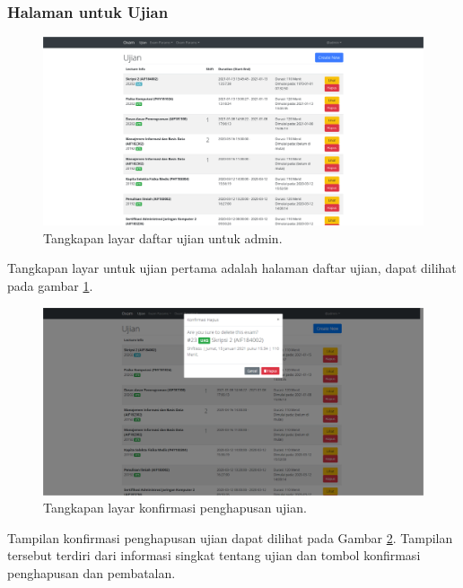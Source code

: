     \subsubsection{Halaman untuk Ujian}
    \begin{figure}
        \centering
        \includegraphics[width=0.7\paperwidth]{Gambar/implemented-interface/admin/ujian-list.png}
        \caption{Tangkapan layar daftar ujian untuk admin.}
        \label{fig:screenshot-admin-exam-list}
    \end{figure}
    Tangkapan layar untuk ujian pertama adalah halaman daftar ujian, dapat dilihat pada gambar
    \ref{fig:screenshot-admin-exam-list}.
    
    \begin{figure}
        \centering
        \includegraphics[width=0.7\paperwidth]{Gambar/implemented-interface/admin/ujian-delete.png}
        \caption{Tangkapan layar konfirmasi penghapusan ujian.}
        \label{fig:screenshot-admin-exam-delete}
    \end{figure}
    Tampilan konfirmasi penghapusan ujian dapat dilihat pada Gambar \ref{fig:screenshot-admin-exam-delete}.
    Tampilan tersebut terdiri dari informasi singkat tentang ujian dan tombol konfirmasi penghapusan
    dan pembatalan.
    
